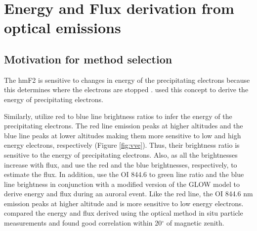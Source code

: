 \documentclass[crop=false,class=mitthesis,oneside,font=12pt]{standalone}
\begin{document}
\section{Energy and Flux derivation from optical emissions}
\subsection{Motivation for method selection}
The hmF2 is sensitive to changes in energy of the precipitating electrons because this determines where the electrons are stopped \citep{rees_1963}. \cite{pallamraju_2011} used this concept to derive the energy of precipitating electrons. 

Similarly, \cite{rees_1974} utilize red to blue line brightness ratios to infer the energy of the precipitating electrons. The red line emission peaks at higher altitudes and the blue line peaks at lower altitudes making them more sensitive to low and high energy electrons, respectively (Figure \ref{fig:vve}). Thus, their brightness ratio is sensitive to the energy of precipitating electrons. Also, as all the brightnesses increase with flux, \cite{pallamraju_2011} and \cite{rees_1963} use the red and the blue brightnesses, respectively, to estimate the flux. In addition, \citet{grubbs_compare} use the OI 844.6 to green line ratio and the blue line brightness in conjunction with a modified version of the GLOW model to derive energy and flux during an auroral event. Like the red line, the OI 844.6 nm emission peaks at higher altitude and is more sensitive to low energy electrons. \citet{grubbs_compare} compared the energy and flux derived using the optical method in situ particle measurements and found good correlation within 20$^\circ$ of magnetic zenith.
\end{document}
